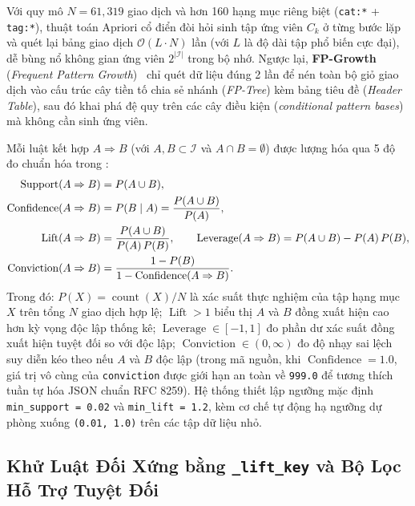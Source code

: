 Với quy mô $N = 61,319$ giao dịch và hơn 160 hạng mục riêng biệt (\texttt{cat:*} + \texttt{tag:*}), thuật toán Apriori cổ điển đòi hỏi sinh tập ứng viên $C_k$ ở từng bước lặp và quét lại bảng giao dịch $\mathcal{O}(L \cdot N)$ lần (với $L$ là độ dài tập phổ biến cực đại), dễ bùng nổ không gian ứng viên $2^{|\mathcal{I}|}$ trong bộ nhớ. Ngược lại, \textbf{FP-Growth} (\textit{Frequent Pattern Growth})~\cite{han2000mining} chỉ quét dữ liệu đúng 2 lần để nén toàn bộ giỏ giao dịch vào cấu trúc cây tiền tố chia sẻ nhánh (\textit{FP-Tree}) kèm bảng tiêu đề (\textit{Header Table}), sau đó khai phá đệ quy trên các cây điều kiện (\textit{conditional pattern bases}) mà không cần sinh ứng viên.

Mỗi luật kết hợp $A \Rightarrow B$ (với $A, B \subset \mathcal{I}$ và $A \cap B = \emptyset$) được lượng hóa qua 5 độ đo chuẩn hóa trong :
\begin{align}
  \operatorname{Support}(A \Rightarrow B) &= P(A \cup B), \notag \\
  \operatorname{Confidence}(A \Rightarrow B) &= P(B \mid A) = \frac{P(A \cup B)}{P(A)}, \notag \\
  \operatorname{Lift}(A \Rightarrow B) &= \frac{P(A \cup B)}{P(A)\,P(B)}, \qquad
  \operatorname{Leverage}(A \Rightarrow B) = P(A \cup B) - P(A)\,P(B), \notag \\
  \operatorname{Conviction}(A \Rightarrow B) &= \frac{1 - P(B)}{1 - \operatorname{Confidence}(A \Rightarrow B)}.
  \label{eq:ch4_rule_metrics}
\end{align}
Trong đó: $P(X) = \operatorname{count}(X)/N$ là xác suất thực nghiệm của tập hạng mục $X$ trên tổng $N$ giao dịch hợp lệ; $\operatorname{Lift} > 1$ biểu thị $A$ và $B$ đồng xuất hiện cao hơn kỳ vọng độc lập thống kê; $\operatorname{Leverage} \in [-1, 1]$ đo phần dư xác suất đồng xuất hiện tuyệt đối so với độc lập; $\operatorname{Conviction} \in (0, \infty)$ đo độ nhạy sai lệch suy diễn kéo theo nếu $A$ và $B$ độc lập (trong mã nguồn, khi $\operatorname{Confidence} = 1.0$, giá trị vô cùng của \texttt{conviction} được giới hạn an toàn về \texttt{999.0} để tương thích tuần tự hóa JSON chuẩn RFC 8259). Hệ thống thiết lập ngưỡng mặc định \texttt{min\_support = 0.02} và \texttt{min\_lift = 1.2}, kèm cơ chế tự động hạ ngưỡng dự phòng xuống \texttt{(0.01, 1.0)} trên các tập dữ liệu nhỏ.

\subsection{\texorpdfstring{Khử Luật Đối Xứng bằng \texttt{\_lift\_key} và Bộ Lọc Hỗ Trợ Tuyệt Đối}{Khu Luat Doi Xung bang lift key va Bo Loc Ho Tro Tuyet Doi}}
\label{sec:ch4_rule_dedup}


